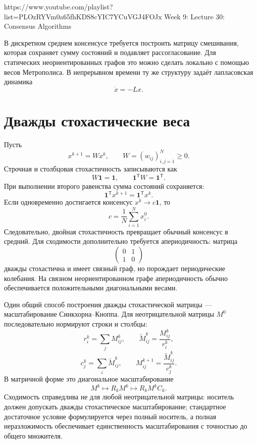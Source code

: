 
\sourcevideo
    {https://www.youtube.com/playlist?list=PLOzRYVm0a65fhKDS8cYIC7YCuVGJ4FOJx}
    {Week 9: Lecture 30: Consensus Algorithms}

В дискретном среднем консенсусе требуется построить матрицу смешивания,
которая сохраняет сумму состояний и подавляет рассогласование. Для
статических неориентированных графов это можно сделать локально с
помощью весов Метрополиса. В непрерывном времени ту же структуру
задаёт лапласовская динамика
\[
    \dot x=-Lx.
\]

\section{Дважды стохастические веса}

Пусть
\[
    x^{k+1}=Wx^k,
    \qquad
    W=(w_{ij})_{i,j=1}^{N}\ge0.
\]
Строчная и столбцовая стохастичность записываются как
\[
    W\mathbf1=\mathbf1,
    \qquad
    \mathbf1^{\mathsf T}W=\mathbf1^{\mathsf T}.
\]
При выполнении второго равенства сумма состояний сохраняется:
\[
    \mathbf1^{\mathsf T}x^{k+1}
    =
    \mathbf1^{\mathsf T}x^k.
\]
Если одновременно достигается консенсус
\(x^k\to c\mathbf1\), то
\[
    c=\frac1N\sum_{i=1}^{N}x_i^0.
\]
Следовательно, двойная стохастичность превращает обычный консенсус в
средний. Для сходимости дополнительно требуется апериодичность:
матрица
\[
    \begin{pmatrix}
        0&1\\
        1&0
    \end{pmatrix}
\]
дважды стохастична и имеет связный граф, но порождает периодические
колебания. На связном неориентированном графе апериодичность обычно
обеспечивается положительными диагональными весами.

Один общий способ построения дважды стохастической матрицы ---
масштабирование Синкхорна--Кноппа. Для неотрицательной матрицы
\(M^0\) последовательно нормируют строки и столбцы:
\[
    r_i^k=\sum_jM_{ij}^k,
    \qquad
    \widetilde M_{ij}^k=\frac{M_{ij}^k}{r_i^k},
\]
\[
    c_j^k=\sum_i\widetilde M_{ij}^k,
    \qquad
    M_{ij}^{k+1}=\frac{\widetilde M_{ij}^k}{c_j^k}.
\]
В матричной форме это диагональное масштабирование
\[
    M^k\longmapsto R_kM^k\longmapsto R_kM^kC_k.
\]
Сходимость справедлива не для любой неотрицательной матрицы: носитель
должен допускать дважды стохастическое масштабирование; стандартное
достаточное условие формулируется через полный носитель, а полная
неразложимость обеспечивает единственность масштабирования с точностью
до общего множителя.

